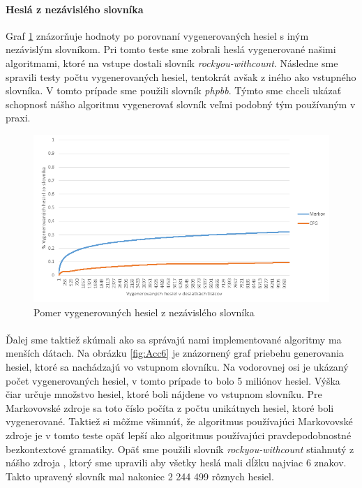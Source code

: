 \paragraph{Heslá z nezávislého slovníka}
Graf \ref{fig:otherDictAcc} znázorňuje hodnoty po porovnaní vygenerovaných hesiel s iným nezávislým slovníkom. Pri tomto teste sme zobrali heslá vygenerované našimi algoritmami, ktoré na vstupe dostali slovník \emph{rockyou-withcount}. Následne sme spravili testy počtu vygenerovaných hesiel, tentokrát avšak z iného ako vstupného slovníka. V tomto prípade sme použili slovník \emph{phpbb}. Týmto sme chceli ukázať schopnosť nášho algoritmu vygenerovať slovník veľmi podobný tým používaným v praxi.

\begin{figure}[ht]
    \centering
    \includegraphics[width=1\textwidth]{otherDictAcc}
    \caption{Pomer vygenerovaných hesiel z nezávislého slovníka}
    \label{fig:otherDictAcc}
\end{figure}

\paragraph{}
Ďalej sme taktiež skúmali ako sa správajú nami implementované algoritmy ma menších dátach. Na obrázku \ref{fig:Acc6} je znázornený graf priebehu generovania hesiel, ktoré sa nachádzajú vo vstupnom slovníku. Na vodorovnej osi je ukázaný počet vygenerovaných hesiel, v tomto prípade to bolo 5 miliónov hesiel. Výška čiar určuje množstvo hesiel, ktoré boli nájdene vo vstupnom slovníku. Pre Markovovské zdroje sa toto číslo počíta z počtu unikátnych hesiel, ktoré boli vygenerované. Taktiež si môžme všimnúť, že algoritmus používajúci Markovovské zdroje je v tomto teste opäť lepší ako algoritmus používajúci pravdepodobnostné bezkontextové gramatiky. Opäť sme použili slovník \emph{rockyou-withcount} stiahnutý z nášho zdroja \cite{dictionaries}, ktorý sme upravili aby všetky heslá mali dĺžku najviac 6 znakov. Takto upravený slovník mal nakoniec 2 244 499 rôznych hesiel.

